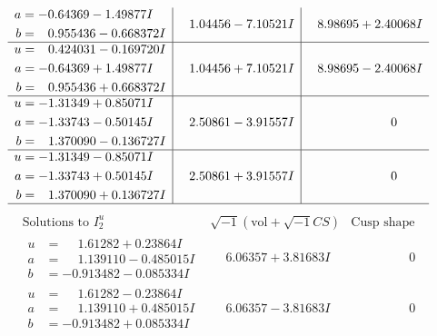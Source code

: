 \documentclass[1p]{elsarticle_modified}
\theoremstyle{definition}
\newcommand{\I}{\sqrt{-1}}
\begin{document}
$$\begin{array}{c|c|c}
\begin{aligned}
a &= -0.64369 - 1.49877 I \\
b &= \phantom{-}0.955436 - 0.668372 I\end{aligned}
 & \phantom{-}1.04456 - 7.10521 I & \phantom{-}8.98695 + 2.40068 I \\ \hline\begin{aligned}
u &= \phantom{-}0.424031 - 0.169720 I \\
a &= -0.64369 + 1.49877 I \\
b &= \phantom{-}0.955436 + 0.668372 I\end{aligned}
 & \phantom{-}1.04456 + 7.10521 I & \phantom{-}8.98695 - 2.40068 I \\ \hline\begin{aligned}
u &= -1.31349 + 0.85071 I \\
a &= -1.33743 - 0.50145 I \\
b &= \phantom{-}1.370090 - 0.136727 I\end{aligned}
 & \phantom{-}2.50861 - 3.91557 I & \phantom{-0.000000 } 0 \\ \hline\begin{aligned}
u &= -1.31349 - 0.85071 I \\
a &= -1.33743 + 0.50145 I \\
b &= \phantom{-}1.370090 + 0.136727 I\end{aligned}
 & \phantom{-}2.50861 + 3.91557 I & \phantom{-0.000000 } 0\\
 \hline 
 \end{array}$$\newpage$$\begin{array}{c|c|c}  
\text{Solutions to }I^u_{2}& \I (\text{vol} + \sqrt{-1}CS) & \text{Cusp shape}\\
 \hline 
\begin{aligned}
u &= \phantom{-}1.61282 + 0.23864 I \\
a &= \phantom{-}1.139110 - 0.485015 I \\
b &= -0.913482 - 0.085334 I\end{aligned}
 & \phantom{-}6.06357 + 3.81683 I & \phantom{-0.000000 } 0 \\ \hline\begin{aligned}
u &= \phantom{-}1.61282 - 0.23864 I \\
a &= \phantom{-}1.139110 + 0.485015 I \\
b &= -0.913482 + 0.085334 I\end{aligned}
 & \phantom{-}6.06357 - 3.81683 I & \phantom{-0.000000 } 0 \\ \hline\begin{aligned}

\end{aligned}
\end{array}$$
\end{document}
